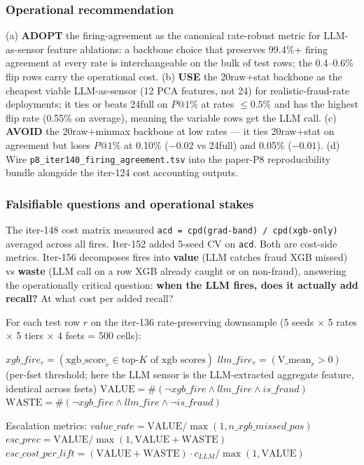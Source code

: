 \documentclass{article}
\begin{document}
\subsubsection{Operational recommendation}
(a) \textbf{ADOPT} the firing-agreement as the canonical rate-robust
metric for LLM-as-sensor feature ablations: a backbone choice that
preserves 99.4\%+ firing agreement at every rate is interchangeable
on the bulk of test rows; the 0.4--0.6\% flip rows carry the
operational cost.  (b) \textbf{USE} the 20raw+stat backbone as the
cheapest viable LLM-as-sensor (12 PCA features, not 24) for
realistic-fraud-rate deployments; it ties or beats 24full on $P@1\%$
at rates $\le 0.5\%$ and has the highest flip rate (0.55\% on
average), meaning the variable rows get the LLM call.  (c)
\textbf{AVOID} the 20raw+minmax backbone at low rates --- it ties
20raw+stat on agreement but loses $P@1\%$ at 0.10\% ($-0.02$ vs
24full) and 0.05\% ($-0.01$).  (d) Wire
\texttt{p8\_iter140\_firing\_agreement.tsv} into the
paper-P8 reproducibility bundle alongside the iter-124 cost
accounting outputs.
 

\subsubsection{Falsifiable questions and operational stakes}
The iter-148 cost matrix measured \texttt{acd = cpd(grad-band) /
cpd(xgb-only)} averaged across all fires. Iter-152 added 5-seed CV on
\texttt{acd}. Both are cost-side metrics. Iter-156 decomposes fires
into \textbf{value} (LLM catches fraud XGB missed) vs \textbf{waste}
(LLM call on a row XGB already caught or on non-fraud), answering the
operationally critical question: \textbf{when the LLM fires, does it
actually add recall?} At what cost per added recall?

For each test row $r$ on the iter-136 rate-preserving downsample (5
seeds $\times$ 5 rates $\times$ 5 tiers $\times$ 4 fsets = 500 cells):

  $xgb\_fire_r = (\text{xgb\_score}_r \in \text{top-}K\text{ of xgb scores})$
  $llm\_fire_r = (\text{V\_mean}_r > 0)$ (per-fset threshold; here
                 the LLM sensor is the LLM-extracted aggregate
                 feature, identical across fsets)
  $\text{VALUE} = \#(\neg xgb\_fire \wedge llm\_fire \wedge is\_fraud)$
  $\text{WASTE} = \#(\neg xgb\_fire \wedge llm\_fire \wedge \neg is\_fraud)$

Escalation metrics:
  $value\_rate = \text{VALUE} / \max(1, n\_xgb\_missed\_pos)$
  $esc\_prec = \text{VALUE} / \max(1, \text{VALUE} + \text{WASTE})$
  $esc\_cost\_per\_lift = (\text{VALUE} + \text{WASTE}) \cdot c_{LLM} / \max(1, \text{VALUE})$
\end{document}
